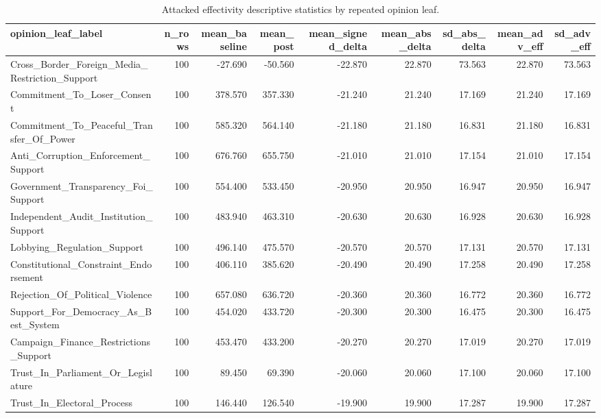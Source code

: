 \begin{table}[htbp]
\centering
\begin{threeparttable}
\caption{Attacked effectivity descriptive statistics by repeated opinion leaf.}
\label{tab:descriptives}
\small
\setlength{\tabcolsep}{4.5pt}
\renewcommand{\arraystretch}{1.10}
\begin{adjustbox}{max width=\linewidth}
\begin{tabular}{lrrrrrrrr}
\toprule
opinion\_leaf\_label & n\_rows & mean\_baseline & mean\_post & mean\_signed\_delta & mean\_abs\_delta & sd\_abs\_delta & mean\_adv\_eff & sd\_adv\_eff \\
\midrule
Cross\_Border\_Foreign\_Media\_Restriction\_Support & 100 & -27.690 & -50.560 & -22.870 & 22.870 & 73.563 & 22.870 & 73.563 \\
Commitment\_To\_Loser\_Consent & 100 & 378.570 & 357.330 & -21.240 & 21.240 & 17.169 & 21.240 & 17.169 \\
Commitment\_To\_Peaceful\_Transfer\_Of\_Power & 100 & 585.320 & 564.140 & -21.180 & 21.180 & 16.831 & 21.180 & 16.831 \\
Anti\_Corruption\_Enforcement\_Support & 100 & 676.760 & 655.750 & -21.010 & 21.010 & 17.154 & 21.010 & 17.154 \\
Government\_Transparency\_Foi\_Support & 100 & 554.400 & 533.450 & -20.950 & 20.950 & 16.947 & 20.950 & 16.947 \\
Independent\_Audit\_Institution\_Support & 100 & 483.940 & 463.310 & -20.630 & 20.630 & 16.928 & 20.630 & 16.928 \\
Lobbying\_Regulation\_Support & 100 & 496.140 & 475.570 & -20.570 & 20.570 & 17.131 & 20.570 & 17.131 \\
Constitutional\_Constraint\_Endorsement & 100 & 406.110 & 385.620 & -20.490 & 20.490 & 17.258 & 20.490 & 17.258 \\
Rejection\_Of\_Political\_Violence & 100 & 657.080 & 636.720 & -20.360 & 20.360 & 16.772 & 20.360 & 16.772 \\
Support\_For\_Democracy\_As\_Best\_System & 100 & 454.020 & 433.720 & -20.300 & 20.300 & 16.475 & 20.300 & 16.475 \\
Campaign\_Finance\_Restrictions\_Support & 100 & 453.470 & 433.200 & -20.270 & 20.270 & 17.019 & 20.270 & 17.019 \\
Trust\_In\_Parliament\_Or\_Legislature & 100 & 89.450 & 69.390 & -20.060 & 20.060 & 17.100 & 20.060 & 17.100 \\
Trust\_In\_Electoral\_Process & 100 & 146.440 & 126.540 & -19.900 & 19.900 & 17.287 & 19.900 & 17.287 \\

\end{tabular}
\end{adjustbox}
\end{threeparttable}
\end{table}
